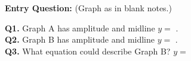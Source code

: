 \documentclass[10pt]{article}
\begin{document}
\vspace{0.08in}

\begin{hookbox}
\textbf{Entry Question:} (Graph as in blank notes.)

\vspace{4pt}
\textbf{Q1.} Graph A has amplitude  and midline $y = $ .\\[4pt]
\textbf{Q2.} Graph B has amplitude  and midline $y = $ .\\[4pt]
\textbf{Q3.} What equation could describe Graph B? $y = $ 

\end{hookbox}

\vspace{0.08in}
\end{document}
